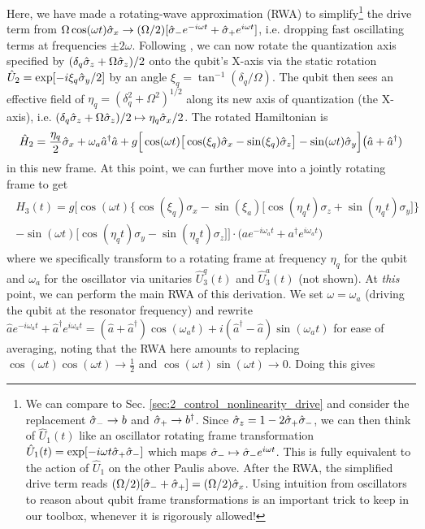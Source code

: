 Here, we have made a rotating-wave approximation (RWA) to simplify\footnote{We can compare to Sec. \ref{sec:2_control_nonlinearity_drive} and consider the replacement $\hat{\sigma}_- \to b$ and $\hat{\sigma}_+\to b^\dagger$. Since $\hat{\sigma}_z = 1-2\hat{\sigma}_+\hat{\sigma}_-$, we can then think of $\hat{U}_1(t)$ like an oscillator rotating frame transformation $\hat{U}_1(t) = \exp[-i\omega t \hat{\sigma}_+\hat{\sigma}_-]$ which maps $\hat{\sigma}_- \mapsto \hat{\sigma}_- e^{i\omega t}$. This is fully equivalent to the action of $\hat{U}_1$ on the other Paulis above. After the RWA, the simplified drive term reads $(\Omega/2)[\hat{\sigma}_- + \hat{\sigma}_+] = (\Omega/2)\hat{\sigma}_x$. Using intuition from oscillators to reason about qubit frame transformations is an important trick to keep in our toolbox, whenever it is rigorously allowed!} the drive term from $\Omega \cos(\omega t)\hat{\sigma}_x \to (\Omega/2)[\hat{\sigma}_- e^{-i\omega t} + \hat{\sigma}_+ e^{i\omega t}]$, i.e. dropping fast oscillating terms at frequencies $\pm 2\omega$. Following \cite{rigetti2010fully}, we can now rotate the quantization axis specified by $(\delta_q\hat{\sigma}_z + \Omega\hat{\sigma}_z)/2$ onto the qubit's X-axis via the static rotation $\hat{U}_2 = \exp[-i\xi_q\hat{\sigma}_y/2]$ by an angle $\xi_q = \tan^{-1}(\delta_q/\Omega)$. The qubit then sees an effective field of $\eta_q = (\delta_q^2 + \Omega^2)^{1/2}$ along its new axis of quantization (the X-axis), i.e. $(\delta_q\hat{\sigma}_z + \Omega\hat{\sigma}_z)/2 \mapsto \eta_q\hat{\sigma}_x/2$. The rotated Hamiltonian is
\begin{equation}
\hat{H}_2 = \frac{\eta_q}{2}\hat{\sigma}_x + \omega_a \hat{a}^\dagger \hat{a} + g\Big[\cos(\omega t)\big[\cos(\xi_q)\hat{\sigma}_x -\sin(\xi_q)\hat{\sigma}_z\big]- \sin(\omega t)\hat{\sigma}_y\Big]\big(\hat{a} + \hat{a}^\dagger)
\end{equation}
in this new frame. At this point, we can further move into a jointly rotating frame to get
\begin{align}
\begin{split}
H_3(t) = g\bigg[\cos(\omega t)\Big\{\cos(\xi_q)\sigma_x -\sin(\xi_a)\big[\cos(\eta_q t)\sigma_z + \sin(\eta_q t)\sigma_y\big]\Big\} \\ - \sin(\omega t)\big[\cos(\eta_q t)\sigma_y - \sin(\eta_q t)\sigma_z\big]\bigg]\cdot\Big(a e^{-i\omega_a t} + a^\dagger e^{i\omega_a t}\Big)
\end{split}
\end{align}
where we specifically transform to a rotating frame at frequency $\eta_q$ for the qubit and $\omega_a$ for the oscillator via unitaries $\hat{U}_3^q(t)$ and $\hat{U}_3^a(t)$ (not shown). At \textit{this} point, we can perform the main RWA of this derivation. We set $\omega = \omega_a$ (driving the qubit at the resonator frequency) and rewrite  $\hat{a} e^{-i\omega_a t} + \hat{a}^\dagger e^{i\omega_a t} = (\hat{a}+\hat{a}^\dagger)\cos(\omega_a t) + i(\hat{a}^\dagger - \hat{a})\sin(\omega_a t)$ for ease of averaging, noting that the RWA here amounts to replacing $\cos(\omega t)\cos(\omega t) \to \frac{1}{2}$ and $\cos(\omega t)\sin(\omega t) \to 0$. Doing this gives
